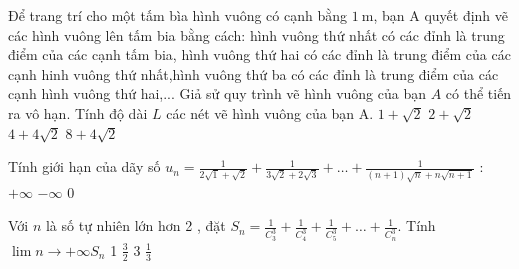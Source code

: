 \begin{ex}%
	Để trang trí cho một tấm bìa hình vuông có cạnh bằng $1 \mathrm{~m}$, bạn $\mathrm{A}$ quyết định vẽ các hình vuông lên tấm bia bằng cách: hình vuông thứ nhất có các đỉnh là trung điểm của các cạnh tấm bia, hình vuông thứ hai có các đỉnh là trung điểm của các cạnh hinh vuông thứ nhất,hình vuông thứ ba có các đỉnh là trung điểm của các cạnh hình vuông thứ hai,... Giả sử quy trình vẽ hình vuông của bạn $A$ có thể tiến ra vô hạn. Tính độ dài $L$ các nét vẽ hình vuông của bạn $\mathrm{A}$.
\choice
{$1+\sqrt{2}$}
{$2+\sqrt{2}$}
{\True $4+4 \sqrt{2}$}
{$8+4 \sqrt{2}$}
\end{ex}
\begin{ex}%
	Tính giới hạn của dãy số $u_n=\frac{1}{2 \sqrt{1}+\sqrt{2}}+\frac{1}{3 \sqrt{2}+2 \sqrt{3}}+\ldots+\frac{1}{(n+1) \sqrt{n}+n \sqrt{n+1}}$ :
\choice
{$+\infty$}
{$-\infty$}
{0 }
{  }
\end{ex}
\begin{ex}%
	Với $n$ là số tự nhiên lớn hơn 2 , đặt $S_n=\frac{1}{C_3^3}+\frac{1}{C_4^3}+\frac{1}{C_5^3}+\ldots+\frac{1}{C_n^3}$. Tính $\lim \limits{n \to +\infty}S_n$
\choice
{1} 
{$\frac{3}{2}$}
{3}
{$\frac{1}{3}$}
\end{ex}
